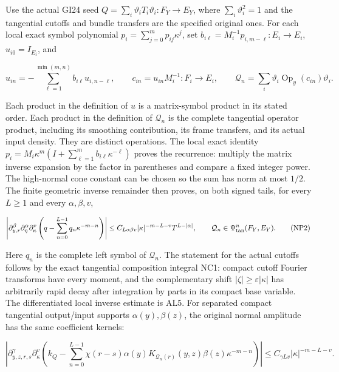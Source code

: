 \documentclass[
  11pt,
]{article}
\begin{document}
Use the actual GI24 seed
\(Q=\sum _i\vartheta _i T_i\vartheta _i:F_Y\to E_Y\), where
\(\sum _i\vartheta _i^2=1\) and the tangential cutoffs and bundle
transfers are the specified original ones. For each local exact symbol
polynomial \(p_i=\sum _{j=0}^m p_{ij}\kappa ^j\), set
\(b_{i\ell }=M_i^{-1}p_{i,m-\ell }:E_i\to E_i\), \(u_{i0}=I_{E_i}\), and

\[
 u_{in}=-\sum_{\ell=1}^{\min(m,n)}b_{i\ell}u_{i,n-\ell},
 \qquad c_{in}=u_{in}M_i^{-1}:F_i\to E_i,
 \qquad \mathcal Q_n=\sum_i\vartheta_i\operatorname{Op}_y(c_{in})\vartheta_i.
 \tag{NP1}
\]

Each product in the definition of \(u\) is a matrix-symbol product in
its stated order. Each product in the definition of \(\mathcal Q _n\) is
the complete tangential operator product, including its smoothing
contribution, its frame transfers, and its actual input density. They
are distinct operations. The local exact identity
\(p_i=M_i\kappa ^m(I+\sum _{\ell =1}^m b_{i\ell }\kappa ^{-\ell })\)
proves the recurrence: multiply the matrix inverse expansion by the
factor in parentheses and compare a fixed integer power. The high-normal
cone constant can be chosen so the sum has norm at most \(1/2\). The
finite geometric inverse remainder then proves, on both signed tails,
for every \(L\ge1\) and every \(\alpha ,\beta ,v\),

\[
 \left|\partial_{y,r}^{\beta}\partial_\eta^\alpha\partial_\kappa^v
  \left(q-\sum_{n=0}^{L-1}q_n\kappa^{-m-n}\right)\right|
 \le C_{L\alpha\beta v}|\kappa|^{-m-L-v}T^{L-|\alpha|},
 \qquad \mathcal Q_n\in\Psi_{\rm tan}^n(F_Y,E_Y).
 \tag{NP2}
\]

Here \(q_n\) is the complete left symbol of \(\mathcal Q _n\). The
statement for the actual cutoffs follows by the exact tangential
composition integral NC1: compact cutoff Fourier transforms have every
moment, and the complementary shift
\(|\zeta |\ge \varepsilon |\kappa |\) has arbitrarily rapid decay after
integration by parts in its compact base variable. The differentiated
local inverse estimate is AL5. For separated compact tangential
output/input supports \(\alpha (y),\beta (z)\), the original normal
amplitude has the same coefficient kernels:

\[
 \left|\partial_{y,z,r,s}^{\gamma}\partial_\kappa^v
  \left(k_Q-\sum_{n=0}^{L-1}
     \chi(r-s)\alpha(y)K_{\mathcal Q_n(r)}(y,z)\beta(z)\kappa^{-m-n}
  \right)\right|
 \le C_{\gamma Lv}|\kappa|^{-m-L-v}.
 \tag{NP3}
\]
\end{document}
